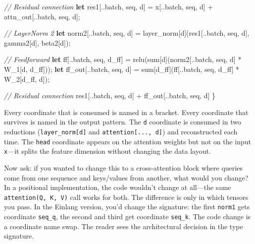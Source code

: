 \documentclass[11pt,titlepage]{article}
\newenvironment{Shaded}{}{}
\newcommand{\CommentTok}[1]{\textcolor[rgb]{0.38,0.63,0.69}{\textit{#1}}}
\newcommand{\KeywordTok}[1]{\textcolor[rgb]{0.00,0.44,0.13}{\textbf{#1}}}
\newcommand{\NormalTok}[1]{#1}
\newcommand{\OperatorTok}[1]{\textcolor[rgb]{0.40,0.40,0.40}{#1}}
\begin{document}
\begin{Shaded}
\begin{Highlighting}[]
    \CommentTok{// Residual connection}
    \KeywordTok{let}\NormalTok{ res1}\OperatorTok{[}\NormalTok{..batch, seq, d}\OperatorTok{]}\NormalTok{ = x}\OperatorTok{[}\NormalTok{..batch, seq, d}\OperatorTok{]}\NormalTok{ + attn_out}\OperatorTok{[}\NormalTok{..batch, seq, d}\OperatorTok{]}\NormalTok{;}
    
    \CommentTok{// LayerNorm 2}
    \KeywordTok{let}\NormalTok{ norm2}\OperatorTok{[}\NormalTok{..batch, seq, d}\OperatorTok{]}\NormalTok{ = layer_norm}\OperatorTok{[}\NormalTok{d}\OperatorTok{]}\NormalTok{(res1}\OperatorTok{[}\NormalTok{..batch, seq, d}\OperatorTok{]}\NormalTok{, gamma2}\OperatorTok{[}\NormalTok{d}\OperatorTok{]}\NormalTok{, beta2}\OperatorTok{[}\NormalTok{d}\OperatorTok{]}\NormalTok{);}
    
    \CommentTok{// Feedforward}
    \KeywordTok{let}\NormalTok{ ff}\OperatorTok{[}\NormalTok{..batch, seq, d_ff}\OperatorTok{]}\NormalTok{ = relu(sum}\OperatorTok{[}\NormalTok{d}\OperatorTok{]}\NormalTok{(norm2}\OperatorTok{[}\NormalTok{..batch, seq, d}\OperatorTok{]}\NormalTok{ * W_1}\OperatorTok{[}\NormalTok{d, d_ff}\OperatorTok{]}\NormalTok{));}
    \KeywordTok{let}\NormalTok{ ff_out}\OperatorTok{[}\NormalTok{..batch, seq, d}\OperatorTok{]}\NormalTok{ = sum}\OperatorTok{[}\NormalTok{d_ff}\OperatorTok{]}\NormalTok{(ff}\OperatorTok{[}\NormalTok{..batch, seq, d_ff}\OperatorTok{]}\NormalTok{ * W_2}\OperatorTok{[}\NormalTok{d_ff, d}\OperatorTok{]}\NormalTok{);}
    
    \CommentTok{// Residual connection}
\NormalTok{    res1}\OperatorTok{[}\NormalTok{..batch, seq, d}\OperatorTok{]}\NormalTok{ + ff_out}\OperatorTok{[}\NormalTok{..batch, seq, d}\OperatorTok{]}
\OperatorTok{\}}
\end{Highlighting}
\end{Shaded}

Every coordinate that is consumed is named in a bracket. Every
coordinate that survives is named in the output pattern. The \texttt{d}
coordinate is consumed in two reductions (\texttt{layer\_norm{[}d{]}}
and \texttt{attention{[}...,\ d{]}}) and reconstructed each time. The
\texttt{head} coordinate appears on the attention weights but not on the
input \texttt{x}---it splits the feature dimension without changing the
data layout.

Now ask: if you wanted to change this to a cross-attention block where
queries come from one sequence and keys/values from another, what would
you change? In a positional implementation, the code wouldn't change at
all---the same \texttt{attention(Q,\ K,\ V)} call works for both. The
difference is only in which tensors you pass. In the Einlang version,
you'd change the signature: the first \texttt{norm1} gets coordinate
\texttt{seq\_q}, the second and third get coordinate \texttt{seq\_k}.
The code change is a coordinate name swap. The reader sees the
architectural decision in the type signature.
\end{document}
